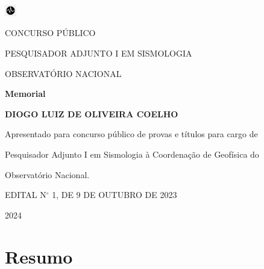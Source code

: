 \documentclass[10pt,a4paper,oneside]{book}
\newcommand{\Year}{2024}
\newcommand{\Author}{Diogo Luiz de Oliveira Coelho}
\begin{document}
\pagestyle{plain}
\frontmatter

\begin{titlepage}
  \begin{center}
    \includegraphics[height=0.5cm]{images/logo_seismo.png}
    \vspace{1cm}

    CONCURSO PÚBLICO
    
    PESQUISADOR ADJUNTO I EM SISMOLOGIA
    
    OBSERVATÓRIO NACIONAL

    \vspace{5cm}

    \textbf{\LARGE Memorial}
    \vspace{1cm}

    \textbf{\LARGE \MakeUppercase{\Author{}}}
    \vspace{5cm}

    {\small
	Apresentado para concurso público de provas e títulos para cargo de

	Pesquisador Adjunto I em Sismologia à Coordenação de Geofísica do

	Observatório Nacional.
      \vspace{1cm}

	EDITAL N$^{\circ}$   1, DE 9 DE OUTUBRO DE 2023
    }
    \vfill

    \Year{}
  \end{center}
\end{titlepage}

\chapter*{Resumo}
\end{document}
